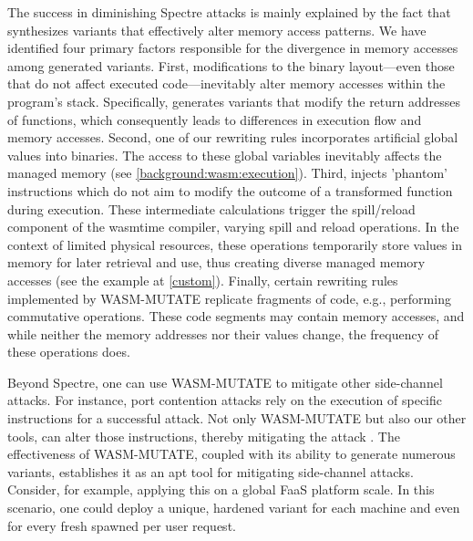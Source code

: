 \begin{strategy}
    The success in diminishing Spectre attacks is mainly explained by the fact that \tool synthesizes variants that effectively alter memory access patterns. 
    We have identified four primary factors responsible for the divergence in memory accesses among \tool generated variants.
    First, modifications to the binary layout—even those that do not affect executed code—inevitably alter memory accesses within the program's stack. 
    Specifically, \tool generates variants that modify the return addresses of functions, which consequently leads to differences in execution flow and memory accesses.
    Second, one of our rewriting rules incorporates artificial global values into \Wasm binaries. 
    The access to these global variables inevitably affects the managed memory (see \autoref{background:wasm:execution}).
    Third, \tool injects 'phantom' instructions which do not aim to modify the outcome of a transformed function during execution. 
    These intermediate calculations trigger the spill/reload component of the wasmtime compiler, varying spill and reload operations. 
    In the context of limited physical resources, these operations temporarily store values in memory for later retrieval and use, thus creating diverse managed memory accesses (see the example at \autoref{custom}).
    Finally, certain rewriting rules implemented by WASM-MUTATE replicate fragments of code, e.g., performing commutative operations. 
    These code segments may contain memory accesses, and while neither the memory addresses nor their values change, the frequency of these operations does.
\end{strategy}



\begin{tcolorbox}[title=Reflection,boxrule=1pt,arc=.2em,boxsep=1.0mm]

    Beyond Spectre, one can use WASM-MUTATE to mitigate other side-channel attacks. 
    For instance, port contention attacks \cite{10.1145/3488932.3517411} rely on the execution of specific instructions for a successful attack. 
    Not only WASM-MUTATE but also our other tools, can alter those instructions, thereby mitigating the attack \cite{10.1007/978-3-642-00730-9_10}. 
    The effectiveness of WASM-MUTATE, coupled with its ability to generate numerous variants, establishes it as an apt tool for mitigating side-channel attacks.
    Consider, for example, applying this on a global FaaS platform scale. 
    In this scenario, one could deploy a unique, hardened variant for each machine and even for every fresh \Wasm spawned per user request.

\end{tcolorbox}


